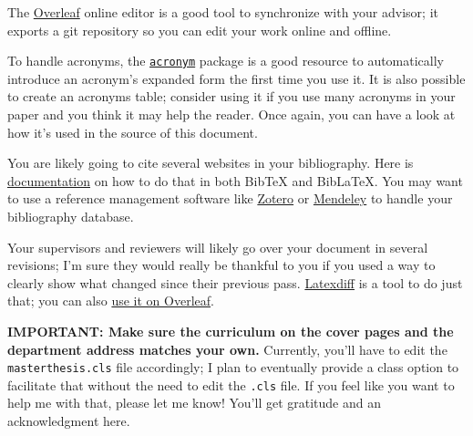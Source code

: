 The \href{https://www.overleaf.com}{Overleaf} online editor is a good tool to synchronize with
your advisor; it exports a git repository so you can edit your work online and offline.

To handle acronyms, the \href{https://ctan.org/pkg/acronym}{\texttt{acronym}} package is a good resource to automatically introduce an acronym's expanded form the first time you use it. It is also possible to create an acronyms table; consider using it if you use many acronyms in your paper and you think it may help the reader. Once again, you can have a look at how it's used in the source of this document.

You are likely going to cite several websites in your bibliography. Here is \href{https://bibtex.eu/faq/how-can-i-use-bibtex-to-cite-a-website/}{documentation} on how to do that in both BibTeX and BibLaTeX. You may want to use a reference management software like \href{https://www.zotero.org/}{Zotero} or \href{https://www.mendeley.com/}{Mendeley} to handle your bibliography database.

Your supervisors and reviewers will likely go over your document in several revisions; I'm sure they would really be thankful to you if you used a way to clearly show what changed since their previous pass. \href{https://ctan.org/pkg/latexdiff}{Latexdiff} is a tool to do just that; you can also \href{https://www.overleaf.com/learn/latex/Articles/How_to_use_latexdiff_on_Overleaf}{use it on Overleaf}.

\textbf{IMPORTANT: Make sure the curriculum on the cover pages and the department address matches your own.} Currently, you'll have to edit the \texttt{masterthesis.cls} file accordingly; I plan to eventually provide a class option to facilitate that without the need to edit the \texttt{.cls} file. If you feel like you want to help me with that, please let me know! You'll get gratitude and an acknowledgment here.

